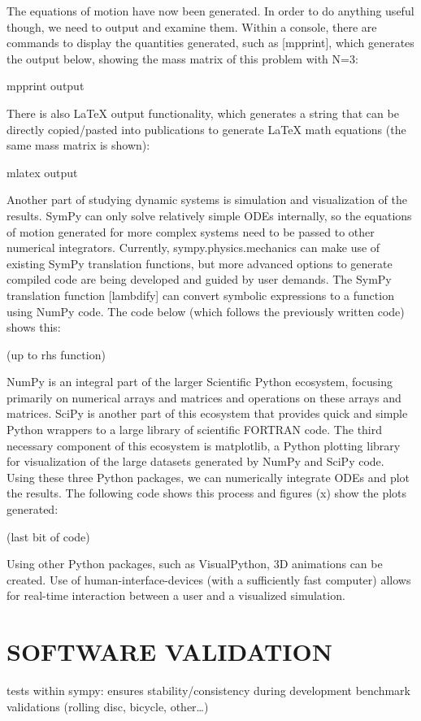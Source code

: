 \documentclass[twocolumn,10pt]{asme2e}
\begin{document}
The equations of motion have now been generated.
In order to do anything useful though, we need to output and examine them.
Within a console, there are commands to display the quantities generated, such
as [mpprint], which generates the output below, showing the mass matrix of this
problem with N=3:

mpprint output

There is also LaTeX output functionality, which generates a string that can be
directly copied/pasted into publications to generate LaTeX math equations (the
same mass matrix is shown):

mlatex output

Another part of studying dynamic systems is simulation and visualization of the
results.
SymPy can only solve relatively simple ODEs internally, so the equations of
motion generated for more complex systems need to be passed to other numerical
integrators.
Currently, sympy.physics.mechanics can make use of existing SymPy translation
functions, but more advanced options to generate compiled code are being
developed and guided by user demands.
The SymPy translation function [lambdify] can convert symbolic expressions to a
function using NumPy code.
The code below (which follows the previously written code) shows this:

(up to rhs function)

NumPy is an integral part of the larger Scientific Python ecosystem, focusing
primarily on numerical arrays and matrices and operations on these arrays and
matrices.
SciPy is another part of this ecosystem that provides quick and simple Python
wrappers to a large library of scientific FORTRAN code.
The third necessary component of this ecosystem is matplotlib, a Python
plotting library for visualization of the large datasets generated by NumPy and
SciPy code.
Using these three Python packages, we can numerically integrate ODEs and plot
the results.
The following code shows this process and figures (x) show the plots generated:

(last bit of code)

Using other Python packages, such as VisualPython, 3D animations can be
created.
Use of human-interface-devices (with a sufficiently fast computer) allows for
real-time interaction between a user and a visualized simulation.
\section*{SOFTWARE VALIDATION}
tests within sympy: ensures stability/consistency during development
benchmark validations (rolling disc, bicycle, other\ldots)
\end{document}
